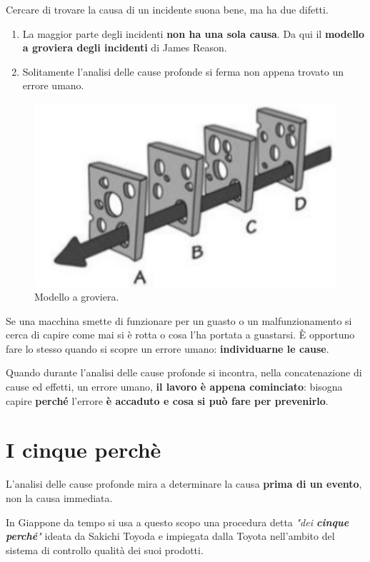 Cercare di trovare la causa di un incidente suona bene, ma ha due difetti.

\begin{enumerate}
	\item La maggior parte degli incidenti \textbf{non ha una sola causa}. Da qui il \textbf{modello a groviera degli incidenti} di James Reason.
	\item Solitamente l'analisi delle cause profonde si ferma non appena trovato un errore umano.
\end{enumerate}

\pagebreak

\begin{figure}[!h]
	\centering
	\includegraphics[scale=0.55]{../immagini/Groviera.png}
	\caption{Modello a groviera.}
\end{figure}

Se una macchina smette di funzionare per un guasto o un malfunzionamento
si cerca di capire come mai si è rotta o cosa l'ha portata a guastarsi. È
opportuno fare lo stesso quando si scopre un errore umano: \textbf{individuarne le cause}.

Quando durante l'analisi delle cause profonde si incontra, nella concatenazione di cause ed effetti, un errore umano, \textbf{il lavoro è appena cominciato}: bisogna capire \textbf{perché} l'errore \textbf{è accaduto e cosa si può fare per prevenirlo}.

\section{I cinque perchè}

L'analisi delle cause profonde mira a determinare la causa \textbf{prima di un evento}, non la causa immediata.

In Giappone da tempo si usa a questo scopo una procedura detta \textit{"dei \textbf{cinque perché}"} ideata da Sakichi Toyoda e impiegata dalla Toyota nell'ambito del sistema di controllo qualità dei suoi prodotti.

